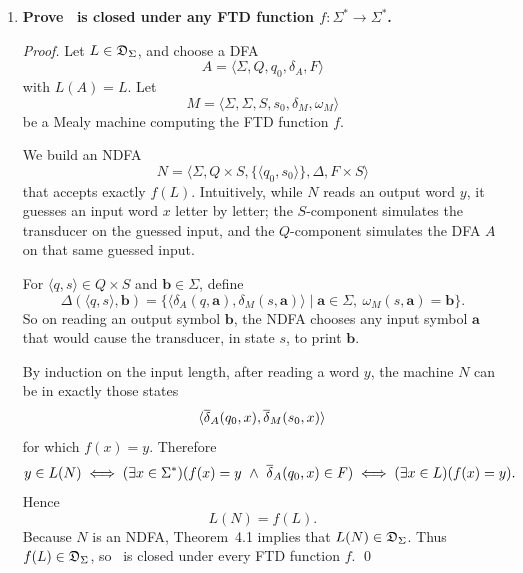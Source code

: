 \begin{enumerate}[{7.}1.]
\begin{proof}
If $\mu:A\to B$ is a homomorphism, by Exercise~7.47(c), $f_A=f_B$.  Hence $A\equiv B$. \qed
\end{proof}

\item \textbf{Prove \DSIG\ is closed under any FTD function $f:\Sigma^*\to\Sigma^*$.}

\begin{proof}
Let $L\in\mathfrak{D}_\Sigma$, and choose a DFA
\[
  A=\langle\Sigma,Q,q_0,\delta_A,F\rangle
\]
with $L(A)=L$.  Let
\[
  M=\langle\Sigma,\Sigma,S,s_0,\delta_M,\omega_M\rangle
\]
be a Mealy machine computing the FTD function $f$.

We build an NDFA
\[
  N=\langle\Sigma,Q\times S,\{\langle q_0,s_0\rangle\},\Delta,F\times S\rangle
\]
that accepts exactly $f(L)$.  Intuitively, while $N$ reads an output word $y$,
it guesses an input word $x$ letter by letter; the $S$-component simulates the
transducer on the guessed input, and the $Q$-component simulates the DFA $A$ on
that same guessed input.

For $\langle q,s\rangle\in Q\times S$ and $\pmb{b}\in\Sigma$, define
\[
  \Delta(\langle q,s\rangle,\pmb{b})
  =\{\langle \delta_A(q,\pmb{a}),\delta_M(s,\pmb{a})\rangle
    \mid \pmb{a}\in\Sigma,\ \omega_M(s,\pmb{a})=\pmb{b}\}.
\]
So on reading an output symbol $\pmb{b}$, the NDFA chooses any input symbol
$\pmb{a}$ that would cause the transducer, in state $s$, to print $\pmb{b}$.

By induction on the input length, after reading a word $y$, the machine $N$ can
be in exactly those states
\[
  \langle \overline{\delta}_A(q_0,x),\overline{\delta}_M(s_0,x)\rangle
\]
for which $f(x)=y$.  Therefore
\[
  y\in L(N)
  \iff (\exists x\in\Sigma^*)(f(x)=y\ \wedge\ \overline{\delta}_A(q_0,x)\in F)
  \iff (\exists x\in L)(f(x)=y).
\]
Hence
\[
  L(N)=f(L).
\]
Because $N$ is an NDFA, Theorem~4.1 implies that $L(N)\in\mathfrak{D}_\Sigma$.  Thus
$f(L)\in\mathfrak{D}_\Sigma$, so \DSIG\ is closed under every FTD function $f$. \qed
\end{proof}

\end{enumerate}
